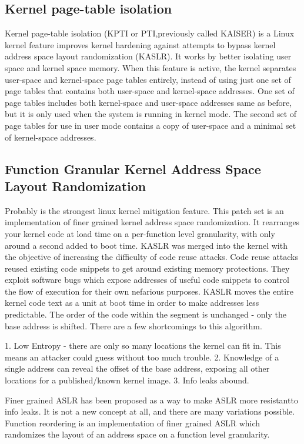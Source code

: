 \documentclass{masterthesis}
\begin{document}
\subsection{Kernel page-table isolation}
\label{subsect:KPTI}
Kernel page-table isolation (KPTI or PTI,previously called KAISER) is a Linux kernel feature improves kernel hardening against attempts to bypass kernel address space layout randomization (KASLR). It works by better isolating user space and kernel space memory.
When this feature is active, the kernel separates user-space and kernel-space page tables entirely, instead of using just one set of page tables that contains both user-space and kernel-space addresses. One set of page tables includes both kernel-space and user-space addresses same as before, but it is only used when the system is running in kernel mode. The second set of page tables for use in user mode contains a copy of user-space and a minimal set of kernel-space addresses.

\subsection{Function Granular Kernel Address Space Layout Randomization}
\label{subsect:FG-KASLR}
Probably is the strongest linux kernel mitigation feature.
This patch set is an implementation of finer grained kernel address space randomization. It rearranges your kernel code at load time on a per-function level granularity, with only around a second added to boot time.
KASLR was merged into the kernel with the objective of increasing the difficulty of code reuse attacks. Code reuse attacks reused existing code snippets to get around existing memory protections. They exploit software bugs which expose addresses of useful code snippets to control the flow of execution for their own nefarious purposes. KASLR moves the entire kernel
code text as a unit at boot time in order to make addresses less predictable.
The order of the code within the segment is unchanged - only the base address is shifted. There are a few shortcomings to this algorithm.

1. Low Entropy - there are only so many locations the kernel can fit in. This means an attacker could guess without too much trouble.
2. Knowledge of a single address can reveal the offset of the base address, exposing all other locations for a published/known kernel image.
3. Info leaks abound.

Finer grained ASLR has been proposed as a way to make ASLR more resistantto info leaks. It is not a new concept at all, and there are many variations possible. Function reordering is an implementation of finer grained ASLR which randomizes the layout of an address space on a function level granularity.
\end{document}
